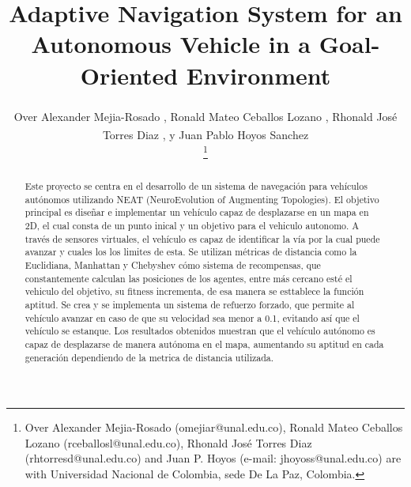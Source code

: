 \documentclass[lettersize, journal]{IEEEtran}
\begin{document}
\title{Adaptive Navigation System for an Autonomous Vehicle in a Goal-Oriented Environment}

\author{Over Alexander Mejia-Rosado \textsuperscript{\href{https://orcid.org/0009-0008-8152-2754}{\textcolor{orcidcolor}{\faOrcid}}}, 
Ronald Mateo Ceballos Lozano \textsuperscript{\href{https://orcid.org/0009-0003-6478-3286}{\textcolor{orcidcolor}{\faOrcid}}}, 
Rhonald José Torres Diaz \textsuperscript{\href{mailto:rhtorresd@unal.edu.co}{\textcolor{orcidcolor}{}}}, y 
Juan Pablo Hoyos Sanchez \textsuperscript{\href{mailto:jhoyoss@unal.edu.co}{\textcolor{orcidcolor}{}}}

\thanks{Over Alexander Mejia-Rosado (omejiar@unal.edu.co), Ronald Mateo Ceballos Lozano (rceballosl@unal.edu.co), Rhonald José Torres Diaz (rhtorresd@unal.edu.co) and Juan P. Hoyos (e-mail: jhoyoss@unal.edu.co) are with Universidad Nacional de Colombia, sede De La Paz, Colombia.}%
}

\maketitle

\begin{abstract}
Este proyecto se centra en el desarrollo de un sistema de navegación para vehículos autónomos utilizando NEAT (NeuroEvolution of Augmenting Topologies). El objetivo principal es diseñar e implementar un vehículo capaz de desplazarse en un mapa en 2D, el cual consta de un punto inical y un objetivo para el vehiculo autonomo. A través de sensores virtuales, el vehículo es capaz de identificar la vía por la cual puede avanzar y cuales los los limites de esta. Se utilizan métricas de distancia como la Euclidiana, Manhattan y Chebyshev cómo sistema de recompensas, que constantemente calculan las posiciones de los agentes, entre más cercano esté el vehiculo del objetivo, su fitness incrementa, de esa manera se esttablece la función aptitud. Se crea y se implementa un sistema de refuerzo forzado, que permite al vehículo avanzar en caso de que su velocidad sea menor a 0.1, evitando así que el vehículo se estanque. Los resultados obtenidos muestran que el vehículo autónomo es capaz de desplazarse de manera autónoma en el mapa, aumentando su aptitud en cada generación dependiendo de la metrica de distancia utilizada.
\end{abstract}
\end{document}
